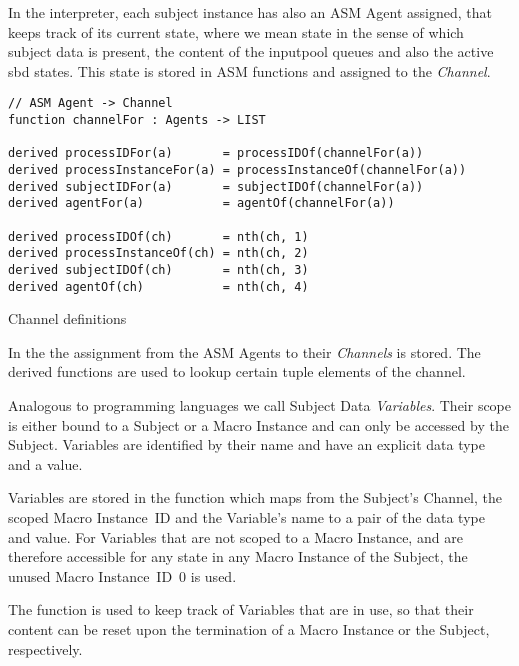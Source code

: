 In the interpreter, each subject instance has also an ASM Agent assigned, that keeps track of its current state,
where we mean state in the sense of which subject data is present, the content of the inputpool queues and also the active sbd states.
This state is stored in ASM functions and assigned to the \textit{Channel}.

\begin{listing}[H]
\begin{verbatim}
// ASM Agent -> Channel
function channelFor : Agents -> LIST

derived processIDFor(a)       = processIDOf(channelFor(a))
derived processInstanceFor(a) = processInstanceOf(channelFor(a))
derived subjectIDFor(a)       = subjectIDOf(channelFor(a))
derived agentFor(a)           = agentOf(channelFor(a))

derived processIDOf(ch)       = nth(ch, 1)
derived processInstanceOf(ch) = nth(ch, 2)
derived subjectIDOf(ch)       = nth(ch, 3)
derived agentOf(ch)           = nth(ch, 4)
\end{verbatim}
\caption{Channel definitions}
\label{lst:shortasm:channelFor}
\end{listing}

In the  the assignment from the ASM Agents to their \textit{Channels} is stored.
The derived functions are used to lookup certain tuple elements of the channel.





Analogous to programming languages we call Subject Data \textit{Variables}.
Their scope is either bound to a Subject or a Macro Instance and can only be
accessed by the Subject. Variables are identified by their name and have an
explicit data type and a value.

Variables are stored in the  function which maps from
the Subject's Channel, the scoped Macro Instance~ID and the Variable's name to
a pair of the data type and value. For Variables that are not scoped to a Macro
Instance, and are therefore accessible for any state in any Macro Instance of
the Subject, the unused Macro Instance~ID~0 is used.

The function  is used to keep track of Variables
that are in use, so that their content can be reset upon the termination of a
Macro Instance or the Subject, respectively.


